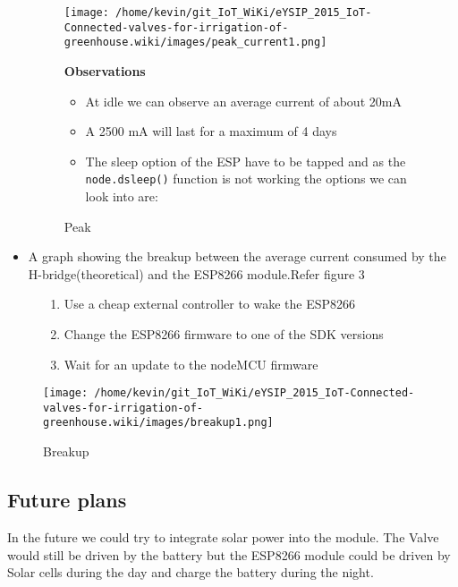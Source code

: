 \documentclass[16pt]{article}
\begin{document}
\begin{itemize}
\begin{figure}
\texttt{[image: /home/kevin/git\_IoT\_WiKi/eYSIP\_2015\_IoT-Connected-valves-for-irrigation-of-greenhouse.wiki/images/peak\_current1.png]}
\caption{Peak}
\textbf{Observations}

\begin{itemize}

\item
  At idle we can observe an average current of about 20mA
\item
  A 2500 mA will last for a maximum of 4 days
\item
  The sleep option of the ESP have to be tapped and as the \\
 \texttt{node.dsleep()} function is not working the options we can look
  into are:
\end{itemize}
\end{figure}

  
\item
  A graph showing the breakup between the average current consumed by
  the H-bridge(theoretical) and the ESP8266 module.Refer figure 3
\end{itemize}

\begin{figure}
\begin{enumerate}

\item
  Use a cheap external controller to wake the ESP8266
\item
  Change the ESP8266 firmware to one of the SDK versions
\item
  Wait for an update to the nodeMCU firmware
\end{enumerate}
\texttt{[image: /home/kevin/git\_IoT\_WiKi/eYSIP\_2015\_IoT-Connected-valves-for-irrigation-of-greenhouse.wiki/images/breakup1.png]}
\caption{Breakup}
\end{figure}
  



\vspace{0.5cm}
\subsection{Future plans}

\vspace{0.3cm}
In the future we could try to integrate solar power into the module. The
Valve would still be driven by the battery but the ESP8266 module could
be driven by Solar cells during the day and charge the battery during
the night.
\end{document}
